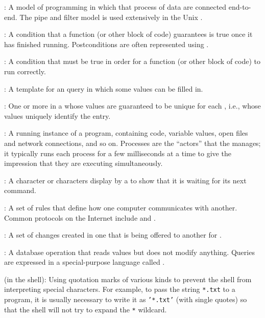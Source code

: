 :
A model of programming in which
 that process 
of data are connected end-to-end. The pipe and filter model is used
extensively in the Unix .

:
A condition that a function (or other block of
code) guarantees is true once it has finished running. Postconditions
are often represented using .

:
A condition that must be true in order for a
function (or other block of code) to run correctly.

:
A template for an 
query in which some values can be filled in.

:
One or more  in
a  whose values are
guaranteed to be unique for each ,
i.e., whose values uniquely identify the entry.

:
A running instance of a program, containing code,
variable values, open files and network connections, and so on.
Processes are the ``actors'' that the
 manages; it typically
runs each process for a few milliseconds at a time to give the
impression that they are executing simultaneously.

:
A character or characters display by a
 to show that it is waiting for its next command.

:
A set of rules that define how one computer communicates with another.
Common protocols on the Internet include  and .
 
:
A set of changes created in one  
that is being offered to another for .

:
A database operation that reads values but does not
modify anything. Queries are expressed in a special-purpose language
called .

 (in the shell):
Using quotation marks of various kinds
to prevent the shell from interpreting special characters. For example,
to pass the string \texttt{*.txt} to a program, it is usually necessary
to write it as \texttt{'*.txt'} (with single quotes) so that the shell
will not try to expand the \texttt{*} wildcard.
 
